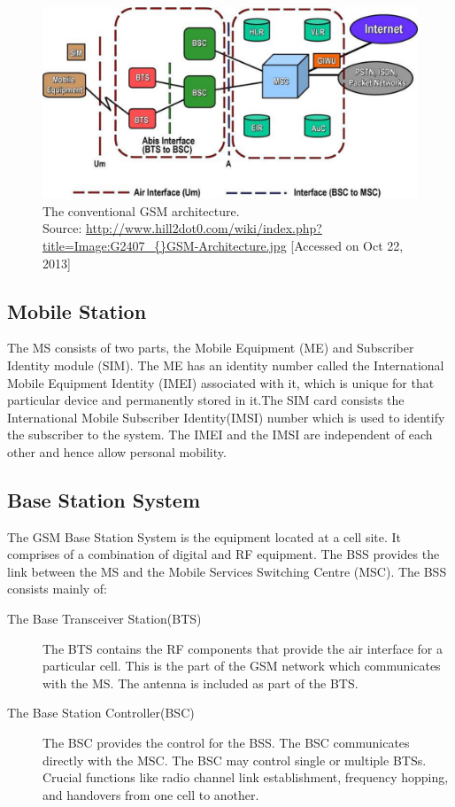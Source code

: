 \begin{figure}[h]
\centering
\includegraphics[width=1\textwidth]{gsmArch}
\caption[The conventional GSM architecture]{The conventional GSM architecture.\\
\footnotesize{Source:
\url{http://www.hill2dot0.com/wiki/index.php?title=Image:G2407\_{}GSM-Architecture.jpg} 
[Accessed on Oct 22, 2013]}}
\label{gsmArch}
\end{figure}

\subsection{Mobile Station}
The MS consists of two parts, the Mobile Equipment (ME) and Subscriber
Identity module (SIM). The ME has an identity number called the International
 Mobile Equipment Identity (IMEI) associated with it, which is unique for
that particular device and permanently stored in it.The SIM card consists
the International Mobile Subscriber Identity(IMSI) number which is used
to identify the subscriber to the system. The IMEI and the IMSI are independent
of each other and hence allow personal mobility.

\subsection{Base Station System}
The GSM Base Station System is the equipment located at a cell site. It
comprises of a combination of digital and RF equipment. The BSS provides
the link between the MS and the Mobile Services Switching Centre (MSC).
The BSS consists mainly of:
\begin{description}
\item[The Base Transceiver Station(BTS)]
The BTS contains the RF components that provide the air interface for
 a particular cell. This is the part of the GSM network which communicates
 with the MS. The antenna is included as part of the BTS.
\item[The Base Station Controller(BSC)]
The BSC provides the control for the BSS. The BSC communicates directly
with the MSC. The BSC may control single or multiple BTSs. Crucial functions
like radio channel link establishment, frequency hopping, and handovers from
one cell to another.

\end{description}

